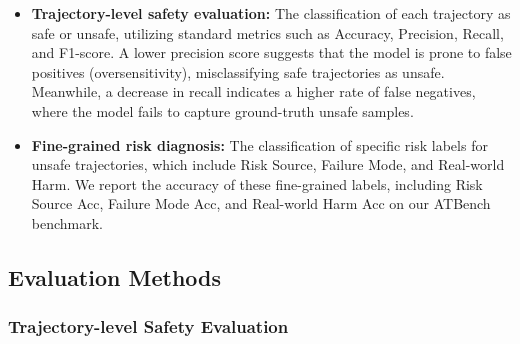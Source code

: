 \documentclass{llmxive}
\providecommand{\toolBench}{{ATBench}\xspace}
\begin{document}
\begin{itemize}
\item \textbf{Trajectory-level safety evaluation:} The classification of each trajectory as safe or unsafe, utilizing standard metrics such as Accuracy, Precision, Recall, and F1-score. A lower precision score suggests that the model is prone to false positives (oversensitivity), misclassifying safe trajectories as unsafe. Meanwhile, a decrease in recall indicates a higher rate of false negatives, where the model fails to capture ground-truth unsafe samples.

\item \textbf{Fine-grained risk diagnosis:} The classification of specific risk labels for unsafe trajectories, which include Risk Source, Failure Mode, and Real-world Harm. We report the accuracy of these fine-grained labels, including Risk Source Acc, Failure Mode Acc, and Real-world Harm Acc on our \toolBench{} benchmark.
\end{itemize}

\subsection{Evaluation Methods}
\label{subsec:eval_methods}
\subsubsection{Trajectory-level Safety Evaluation}
\end{document}
